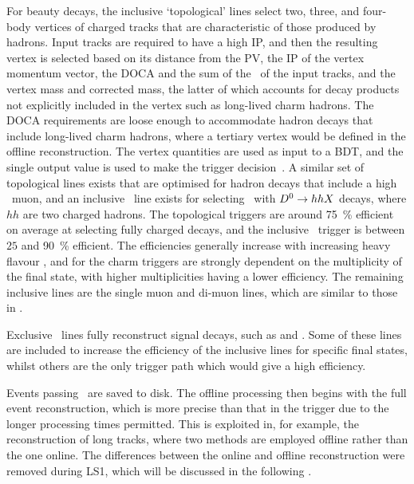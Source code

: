 For beauty decays, the inclusive `topological' lines select two, three, and 
four-body vertices of charged tracks that are characteristic of those produced 
by \Pbottom hadrons.
Input tracks are required to have a high \ac{IP}, and then the resulting vertex 
is selected based on its distance from the \ac{PV}, the \ac{IP} of the vertex 
momentum vector, the \ac{DOCA} and the sum of the \pT\ of the input tracks, and 
the vertex mass and corrected mass, the latter of which accounts for decay 
products not explicitly included in the vertex such as long-lived charm 
hadrons.
The \ac{DOCA} requirements are loose enough to accommodate \Pbottom hadron 
decays that include long-lived charm hadrons, where a tertiary vertex would be 
defined in the offline reconstruction.
The vertex quantities are used as input to a \ac{BDT}, and the single output 
value is used to make the trigger 
decision~\cite{Gligorov:2011qxa,Gligorov:1384380}.
A similar set of topological lines exists that are optimised for \Pbottom 
hadron decays that include a high \pT\ muon, and an inclusive \PDstarp\ line 
exists for selecting \DstToDzpi\ with $D^{0} \to hhX$ decays, where $hh$ 
are two charged hadrons.
The topological \PB triggers are around \SI{75}{\percent} efficient on average 
at selecting fully charged \PB decays, and the inclusive \PDstarp\ trigger is 
between $25$ and \SI{90}{\percent} efficient.
The efficiencies generally increase with increasing heavy flavour \pT, and for 
the charm triggers are strongly dependent on the multiplicity of the final 
state, with higher multiplicities having a lower efficiency.
The remaining inclusive lines are the single muon and di-muon lines, which are 
similar to those in \hltone.

Exclusive \hlttwo\ lines fully reconstruct signal decays, such as 
\decay{\PB}{\pippim} and \decay{\PLambdac}{\Pproton\PKminus\Ppiplus}.
Some of these lines are included to increase the efficiency of the inclusive 
lines for specific final states, whilst others are the only trigger path which 
would give a high efficiency.

Events passing \hlttwo\ are saved to disk.
The offline processing then begins with the full event reconstruction, which is 
more precise than that in the trigger due to the longer processing times 
permitted.
This is exploited in, for example, the reconstruction of long tracks, where two 
methods are employed offline rather than the one online.
The differences between the online and offline reconstruction were removed 
during \ac{LS1}, which will be discussed in the following 
.


